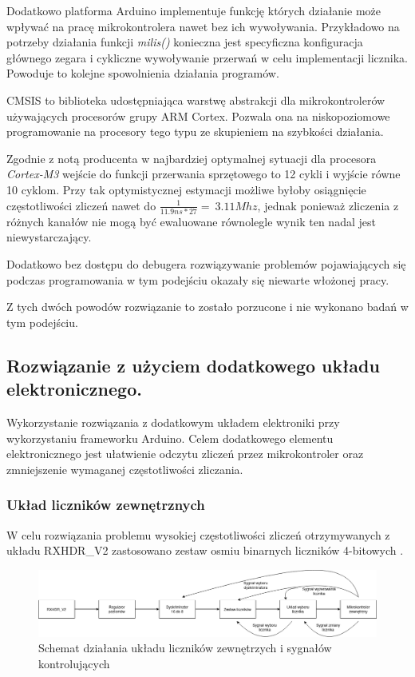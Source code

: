 \documentclass[a4paper,12pt]{article}
\begin{document}
Dodatkowo platforma Arduino implementuje funkcję których działanie może wpływać na pracę mikrokontrolera nawet bez ich wywoływania. 
Przykładowo na potrzeby działania funkcji \textit{milis()} konieczna jest specyficzna konfiguracja głównego zegara i cykliczne wywoływanie przerwań w celu implementacji licznika. Powoduje to kolejne spowolnienia działania programów. 


CMSIS to biblioteka udostępniająca warstwę abstrakcji dla mikrokontrolerów używających procesorów grupy ARM Cortex. 
Pozwala ona na niskopoziomowe programowanie na procesory tego typu ze skupieniem na szybkości działania.

Zgodnie z notą producenta \cite{interupt latency} w najbardziej optymalnej sytuacji dla procesora \textit{Cortex-M3} wejście do funkcji przerwania sprzętowego to 12 cykli i wyjście równe 10 cyklom. 
Przy tak optymistycznej estymacji możliwe byłoby osiągnięcie częstotliwości zliczeń nawet do $\frac{1}{11.9ns*27} = ~ 3.11 Mhz$, jednak ponieważ zliczenia z różnych kanałów nie mogą być ewaluowane równolegle wynik ten nadal jest niewystarczający. 

Dodatkowo bez dostępu do debugera rozwiązywanie problemów pojawiających się podczas programowania w tym podejściu okazały się niewarte włożonej pracy. 

Z tych dwóch powodów rozwiązanie to zostało porzucone i nie wykonano badań w tym podejściu. 


\subsection{Rozwiązanie z użyciem dodatkowego układu elektronicznego.}

Wykorzystanie rozwiązania z dodatkowym układem elektroniki przy wykorzystaniu frameworku Arduino. Celem dodatkowego elementu elektronicznego jest ułatwienie odczytu zliczeń przez mikrokontroler oraz zmniejszenie wymaganej częstotliwości zliczania. 

\subsubsection{Układ liczników zewnętrznych}

W celu rozwiązania problemu wysokiej częstotliwości zliczeń otrzymywanych z układu RXHDR\_V2 \cite{master} zastosowano zestaw osmiu binarnych liczników 4-bitowych \cite{licznik doc}. 


\begin{figure}[]
        \centering
        \includegraphics[width=\textwidth]{Elektronika_flow_chart.png}
        \caption{Schemat działania układu liczników zewnętrzych i sygnałów kontrolujących}
        \label{licznik flowchart}
\end{figure}
\end{document}
